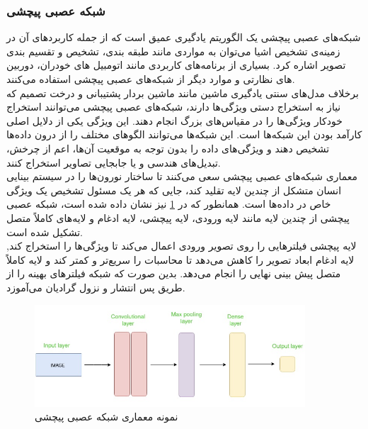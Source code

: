 \subsubsection{شبکه‌ عصبی پیچشی}
شبکه‌های عصبی پیچشی یک الگوریتم یادگیری عمیق است که از جمله کاربرد‌های آن در زمینه‌ی تشخیص اشیا می‌توان به مواردی مانند طبقه بندی، تشخیص و تقسیم بندی تصویر 
اشاره کرد. بسیاری از برنامه‌های کاربردی مانند اتومبیل های خودران، دوربین های نظارتی و موارد دیگر از شبکه‌های عصبی پیچشی استفاده می‌کنند.
\\
برخلاف مدل‌های سنتی یادگیری ماشین مانند ماشین بردار پشتیبانی و درخت‌ تصمیم
که نیاز به استخراج دستی ویژگی‌ها دارند، شبکه‌های عصبی پیچشی می‌توانند استخراج خودکار ویژگی‌ها را در مقیاس‌های بزرگ 
انجام دهند. این ویژگی یکی از دلایل اصلی کارآمد بودن این شبکه‌ها است. این شبکه‌ها می‌توانند الگوهای مختلف را از درون داده‌ها تشخیص دهند و ویژگی‌های داده را بدون توجه به موقعیت آن‌ها، اعم از چرخش، تبدیل‌‌های هندسی و یا جابجایی تصاویر استخراج کنند.
\\
معماری شبکه‌های عصبی پیچشی سعی می‌کنند تا ساختار نورون‌ها را در سیستم بینایی انسان متشکل از چندین لایه تقلید کند، جایی که هر یک مسئول تشخیص یک ویژگی خاص در داده‌ها است. 
همانطور که در 
\cref{cnn_arch}
نیز نشان داده شده است، شبکه عصبی پیچشی از چندین لایه مانند لایه ورودی، لایه پیچشی، لایه ادغام  و لایه‌های کاملاً متصل تشکیل شده است.
\\
لایه پیچشی فیلترهایی را روی تصویر ورودی اعمال می‌کند تا ویژگی‌ها را استخراج کند, لایه ادغام ابعاد تصویر را کاهش می‌دهد تا محاسبات را سریع‌تر و کمتر کند و لایه کاملاً متصل پیش بینی نهایی را انجام می‌دهد. بدین صورت که شبکه فیلترهای بهینه را از طریق پس انتشار
و نزول گرادیان
می‌آموزد.


\begin{figure}[h]
    \centering
    \includegraphics[width=0.9\textwidth]{CNN_arch.png}
    \caption[نمونه معماری شبکه عصبی پیچشی]{نمونه معماری شبکه عصبی پیچشی \cite{Introduc84:online}}\label{cnn_arch}
\end{figure}

